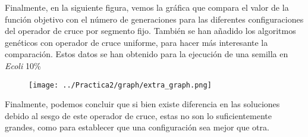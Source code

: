 \begin{table}[H]
\centering
{}
\end{table}
\newpage
Finalmente, en la siguiente figura, vemos la gráfica que compara el valor de la función objetivo con el número de generaciones para las diferentes configuraciones del operador de cruce por segmento fijo. También se han añadido los algoritmos genéticos con operador de cruce uniforme, para hacer más interesante la comparación. Estos datos se han obtenido para la ejecución de una semilla en \emph{Ecoli} 10\%

\begin{figure}[H]
   \centering
   \texttt{[image: ../Practica2/graph/extra\_graph.png]}
   \caption{}
\end{figure}

Finalmente, podemos concluir que si bien existe diferencia en las soluciones debido al sesgo de este operador de cruce, estas no son lo suficientemente grandes, como para establecer que una configuración sea mejor que otra.
